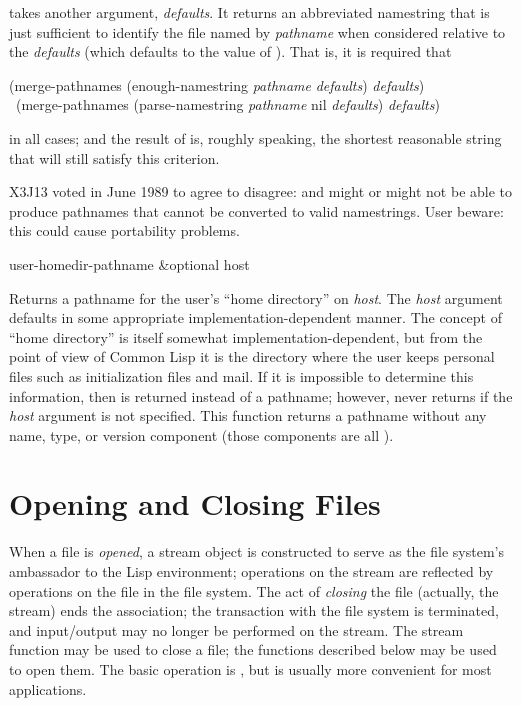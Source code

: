 \begin{defun}[Function]
 takes another argument, \emph{defaults}.
It returns an abbreviated namestring that is just sufficient to
identify the file named by \emph{pathname} when considered relative
to the \emph{defaults} (which defaults to the value of
).  That is, it is required
that
\begin{lisp}
(merge-pathnames (enough-namestring \emph{pathname} \emph{defaults}) \emph{defaults}) {\EQ} \\
~(merge-pathnames (parse-namestring \emph{pathname} nil \emph{defaults}) \emph{defaults})
\end{lisp}
in all cases; and the result of  is, roughly speaking,
the shortest reasonable string that will still satisfy this criterion.
\begin{newer}
X3J13 voted in June 1989  to agree to disagree:
 and  might or might not be able to produce pathnames
that cannot be converted to valid namestrings.
User beware: this could cause portability problems.
\end{newer}
\end{defun}

\begin{defun}[Function]
user-homedir-pathname &optional host

Returns a pathname for the user's ``home directory'' on \emph{host}.
The \emph{host} argument
defaults in some appropriate implementation-dependent manner.  The
concept of ``home directory'' is itself somewhat
implementation-dependent, but from the point of view of Common Lisp it is the
directory where the user keeps personal files such as initialization
files and mail.  If it is impossible to determine this information,
then {\nil} is returned instead of a pathname; however,
 never returns {\nil} if the \emph{host} argument
is not specified.
This function returns a pathname without any name, type,
or version component (those components are all {\nil}).
\end{defun}


\section{Opening and Closing Files}

When a file is \emph{opened}, a stream object is constructed to serve
as the file system's ambassador to the Lisp environment;
operations on the stream are reflected by operations on the file
in the file system.  The act of \emph{closing} the file (actually,
the stream) ends the association; the transaction with the file
system is terminated, and input/output may no longer be performed
on the stream.  The stream function  may be used
to close a file; the functions described below may be used to open them.
The basic operation is , but  is usually
more convenient for most applications.

